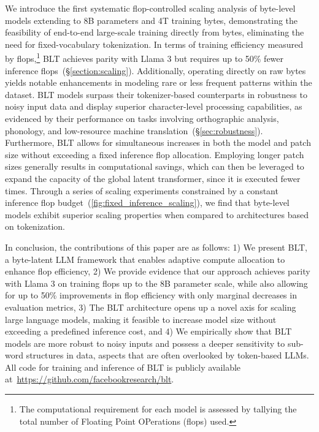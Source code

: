 We introduce the first systematic flop-controlled scaling analysis of byte-level models extending to 8B parameters and 4T training bytes, demonstrating the feasibility of end-to-end large-scale training directly from bytes, eliminating the need for fixed-vocabulary tokenization. In terms of training efficiency measured by flops,\footnote{The computational requirement for each model is assessed by tallying the total number of Floating Point OPerations (flops) used.} {\textsc BLT} achieves parity with Llama 3 but requires up to 50\% fewer inference flops~(\S\ref{section:scaling}). Additionally, operating directly on raw bytes yields notable enhancements in modeling rare or less frequent patterns within the dataset. {\textsc BLT} models surpass their tokenizer-based counterparts in robustness to noisy input data and display superior character-level processing capabilities, as evidenced by their performance on tasks involving orthographic analysis, phonology, and low-resource machine translation~(\S\ref{sec:robustness}). Furthermore, {\textsc BLT} allows for simultaneous increases in both the model and patch size without exceeding a fixed inference flop allocation. Employing longer patch sizes generally results in computational savings, which can then be leveraged to expand the capacity of the global latent transformer, since it is executed fewer times. Through a series of scaling experiments constrained by a constant inference flop budget~(\autoref{fig:fixed_inference_scaling}), we find that byte-level models exhibit superior scaling properties when compared to architectures based on tokenization.

In conclusion, the contributions of this paper are as follows: 1) We present {\textsc BLT}, a byte-latent LLM framework that enables adaptive compute allocation to enhance flop efficiency, 2) We provide evidence that our approach achieves parity with Llama 3 on training flops up to the 8B parameter scale, while also allowing for up to 50\% improvements in flop efficiency with only marginal decreases in evaluation metrics, 3) The {\textsc BLT} architecture opens up a novel axis for scaling large language models, making it feasible to increase model size without exceeding a predefined inference cost, and 4) We empirically show that {\textsc BLT} models are more robust to noisy inputs and possess a deeper sensitivity to sub-word structures in data, aspects that are often overlooked by token-based LLMs. All code for training and inference of {\textsc BLT} is publicly available at~\url{https://github.com/facebookresearch/blt}.

